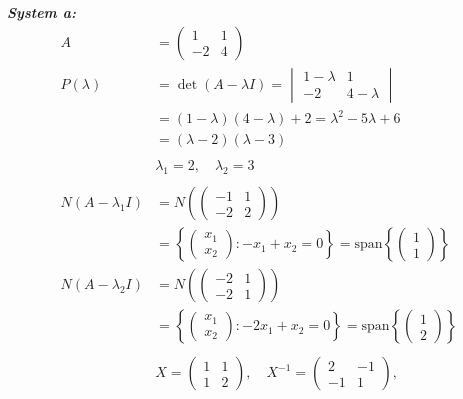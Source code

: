 \documentclass{article}
\begin{document}
\vspace{0.2cm}\noindent\textbf{\textit{System a:}}
\begin{align*}
    A &= \begin{pmatrix} 1 & 1 \\ -2 & 4 \end{pmatrix} \\
    P(\lambda) &= \det(A - \lambda I) = \begin{vmatrix} 1 - \lambda & 1 \\ -2 & 4 - \lambda \end{vmatrix} \\
    &= (1 - \lambda)(4 - \lambda) + 2 = \lambda^2 - 5\lambda + 6 \\
    &= (\lambda - 2)(\lambda - 3) \\
    \\
    &\lambda_1 = 2, \quad \lambda_2 = 3 \\
    \\
    N(A - \lambda_1 I) &= N\left(\begin{pmatrix} -1 & 1 \\ -2 & 2 \end{pmatrix}\right) \\
    &= \left\{ \begin{pmatrix} x_1 \\ x_2 \end{pmatrix} : -x_1 + x_2 = 0 \right\}
    = \text{span}\left\{ \begin{pmatrix} 1 \\ 1 \end{pmatrix} \right\} \\
    N(A - \lambda_2 I) &= N\left(\begin{pmatrix} -2 & 1 \\ -2 & 1 \end{pmatrix}\right) \\
    &= \left\{ \begin{pmatrix} x_1 \\ x_2 \end{pmatrix} : -2x_1 + x_2 = 0 \right\}
    = \text{span}\left\{ \begin{pmatrix} 1 \\ 2 \end{pmatrix} \right\} \\
    \\
    &X = \begin{pmatrix} 1 & 1 \\ 1 & 2 \end{pmatrix} , \quad
    X^{-1} = \begin{pmatrix} 2 & -1 \\ -1 & 1 \end{pmatrix} , \quad

\end{align*}
\end{document}

